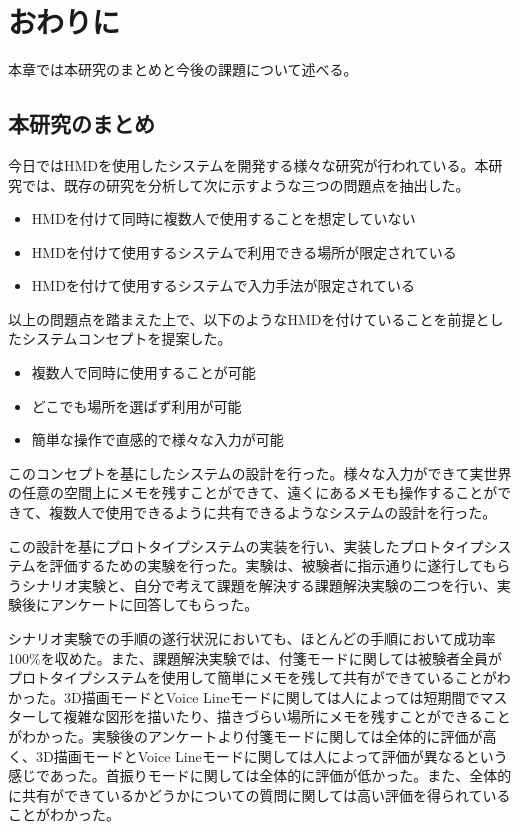 \documentclass[11pt,a4j, titlepage]{jarticle} %
\begin{document}
\newpage
\section{おわりに}
本章では本研究のまとめと今後の課題について述べる。

\subsection{本研究のまとめ}
今日ではHMDを使用したシステムを開発する様々な研究が行われている。本研究では、既存の研究を分析して次に示すような三つの問題点を抽出した。

\begin{itemize}
	\item HMDを付けて同時に複数人で使用することを想定していない
        \item HMDを付けて使用するシステムで利用できる場所が限定されている
	\item HMDを付けて使用するシステムで入力手法が限定されている
\end{itemize}

以上の問題点を踏まえた上で、以下のようなHMDを付けていることを前提としたシステムコンセプトを提案した。

\begin{itemize}
	\item 複数人で同時に使用することが可能
        \item どこでも場所を選ばず利用が可能
	\item 簡単な操作で直感的で様々な入力が可能
\end{itemize}

このコンセプトを基にしたシステムの設計を行った。様々な入力ができて実世界の任意の空間上にメモを残すことができて、遠くにあるメモも操作することができて、複数人で使用できるように共有できるようなシステムの設計を行った。

この設計を基にプロトタイプシステムの実装を行い、実装したプロトタイプシステムを評価するための実験を行った。実験は、被験者に指示通りに遂行してもらうシナリオ実験と、自分で考えて課題を解決する課題解決実験の二つを行い、実験後にアンケートに回答してもらった。

シナリオ実験での手順の遂行状況においても、ほとんどの手順において成功率100\%を収めた。また、課題解決実験では、付箋モードに関しては被験者全員がプロトタイプシステムを使用して簡単にメモを残して共有ができていることがわかった。3D描画モードとVoice Lineモードに関しては人によっては短期間でマスターして複雑な図形を描いたり、描きづらい場所にメモを残すことができることがわかった。実験後のアンケートより付箋モードに関しては全体的に評価が高く、3D描画モードとVoice Lineモードに関しては人によって評価が異なるという感じであった。首振りモードに関しては全体的に評価が低かった。また、全体的に共有ができているかどうかについての質問に関しては高い評価を得られていることがわかった。
\end{document}
